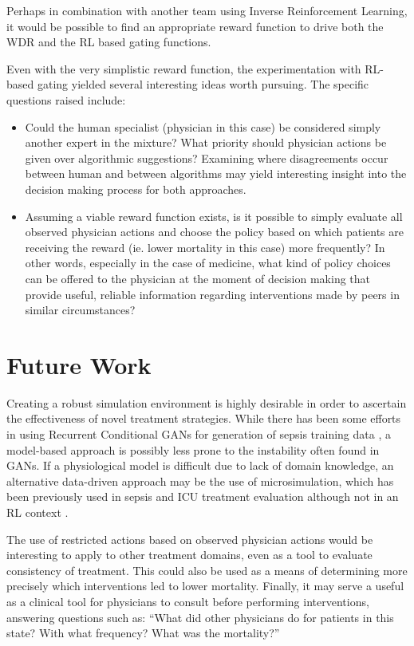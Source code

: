 \documentclass[letterpaper]{article}
\begin{document}
Perhaps in combination with
another team using Inverse Reinforcement Learning, it would be possible to find an 
appropriate reward function to drive both the WDR and the RL based gating functions.

Even with the very simplistic reward function, the experimentation with RL-based 
gating yielded several interesting ideas worth pursuing. The specific questions raised include:

\begin{itemize}
\item Could the human specialist (physician in this case) be considered simply another
expert in the mixture? What priority should physician actions be given over algorithmic
suggestions? Examining
where disagreements occur between human and between algorithms may yield interesting
insight into the decision making process for both approaches.
\item Assuming a viable reward function exists, is it possible to simply evaluate all
observed physician actions and choose the policy based on which patients are receiving
the reward (ie. lower mortality in this case) more frequently? In other words, 
especially in the case of medicine, what kind of policy choices can be offered to the
physician at the moment of decision making that provide useful, reliable information regarding
interventions made by peers in similar circumstances?
\end{itemize}


\section{Future Work}

Creating a robust simulation environment is highly desirable in order to ascertain the effectiveness
of novel treatment strategies. While there has been some efforts in using Recurrent Conditional GANs for generation of sepsis training data \cite{esteban2017real}, a model-based approach is possibly less 
prone to the instability often found in GANs. If a physiological model is difficult due to lack of 
domain knowledge, an alternative data-driven approach may be the use of 
microsimulation, which has been previously used in sepsis and ICU treatment evaluation although not in an
RL context
\cite{clermont2004dynamic,saka2007use}.

The use of restricted actions based on observed physician actions would be interesting to apply to other
treatment domains, even as a tool to evaluate consistency of treatment. This could also be used as a means
of determining more precisely which interventions led to lower mortality. Finally, it may
serve a useful as a clinical tool for physicians to consult before performing interventions, answering
questions such as: ``What did other physicians do for patients in this state? With what frequency? What was the 
mortality?''
\end{document}
